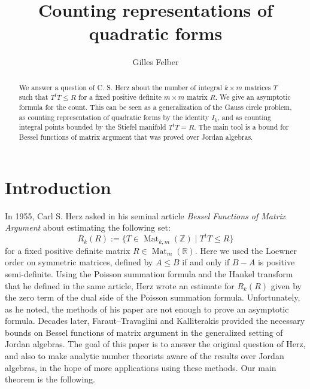 \documentclass[oneside]{amsart}
\numberwithin{equation}{section}
\theoremstyle{definition}
\theoremstyle{remark}
\theoremstyle{remark}
\newcommand{\RR}{\mathbb R}
\newcommand{\ZZ}{\mathbb Z}
\DeclareMathOperator{\Mat}{Mat}
\begin{document}

\author{Gilles Felber}
\address{Alfréd Rényi Institute of Mathematics, Reáltanoda street 13-15, H-1053, Budapest}

\title{Counting representations of quadratic forms}
\begin{abstract}
We answer a question of C. S. Herz about the number of integral $k\times m$ matrices $T$ such that $T^tT\leq R$ for a fixed positive definite $m\times m$ matrix $R$. We give an asymptotic formula for the count. This can be seen as a generalization of the Gauss circle problem, as counting representation of quadratic forms by the identity $I_k$, and as counting integral points bounded by the Stiefel manifold $T^tT=R$. The main tool is a bound for Bessel functions of matrix argument that was proved over Jordan algebras.
\end{abstract}
\maketitle



\section{Introduction}
In 1955, Carl S. Herz asked in his seminal article \emph{Bessel Functions of Matrix Argument} \cite{Her55} about estimating the following set:
$$R_k(R):=\{T\in\Mat_{k,m}(\ZZ)\mid T^tT\leq R\}$$
for a fixed positive definite matrix $R\in\Mat_m(\RR)$. Here we used the Loewner order on symmetric matrices, defined by $A\leq B$ if and only if $B-A$ is positive semi-definite. Using the Poisson summation formula and the Hankel transform that he defined in the same article, Herz wrote an estimate for $R_k(R)$ given by the zero term of the dual side of the Poisson summation formula. Unfortunately, as he noted, the methods of his paper are not enough to prove an asymptotic formula. Decades later, Faraut--Travaglini \cite{FT87} and Kalliterakis \cite{Kal01} provided the necessary bounds on Bessel functions of matrix argument in the generalized setting of Jordan algebras. The goal of this paper is to answer the original question of Herz, and also to make analytic number theorists aware of the results over Jordan algebras, in the hope of more applications using these methods. Our main theorem is the following.
\end{document}

